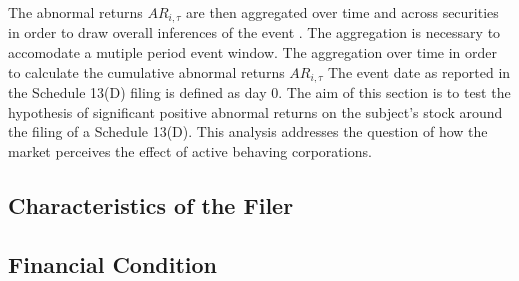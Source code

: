 \documentclass[12pt]{article}
\begin{document}
The abnormal returns $AR_{i,\tau}$ are then aggregated over time and across securities in order to draw overall inferences of the event \citep{MacKinlay1997}. The aggregation is necessary to accomodate a mutiple period event window. The aggregation over time in order to calculate the cumulative abnormal returns $AR_{i,\tau}$
The event date as reported in the Schedule 13(D) filing is defined as day 0.
The aim of this section is to test the hypothesis of significant positive
abnormal returns on the subject's stock around the filing of a Schedule 13(D). This analysis addresses the question of how the market perceives the effect of active behaving corporations. 

\subsection{Characteristics of the Filer}
\pagebreak

\subsection{Financial Condition}
\end{document}
